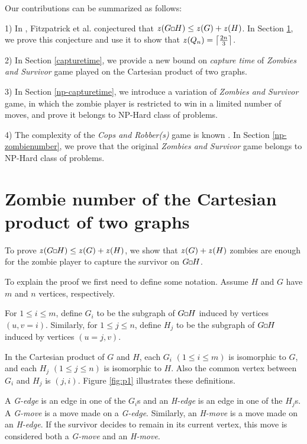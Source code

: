 \documentclass[1p]{elsarticle}
\DeclarePairedDelimiter\ceil{\lceil}{\rceil} \DeclarePairedDelimiter\floor{\lfloor}{\rfloor}
\newcommand{\zn}{\ooalign{$z$\cr\hfil\rule[.5ex]{.2em}{.08ex}\hfil\cr}}
\newcommand{\sq}[1][black]{%
\begin{tikzpicture}                                                           
  \draw[#1] (2pt,0pt) -- (6pt,0pt);   
  \draw[#1] (2pt,0pt) -- (2pt,4pt);    
  \draw[#1] (2pt,4pt) -- (6pt,4pt);   
  \draw[#1] (6pt,0pt) -- (6pt,4pt);
\end{tikzpicture}%
}
\begin{document}
Our contributions can be summarized as follows:

1) In \cite{Fitz16}, Fitzpatrick et al. conjectured that $\zn(G \sq H) \leq \zn(G) + \zn(H)$. In Section \ref{conj-proof}, we prove this conjecture and
use it to show that $\zn(Q_n) = \ceil*{\frac{2n}{3}}$. 

2) In Section \ref{capturetime}, we provide a new bound on {\it capture time} of {\it Zombies and Survivor} game played on the Cartesian
product of two graphs. 

3) In Section \ref{np-capturetime}, we introduce a variation of {\it Zombies and Survivor} game, in which the zombie
player is restricted to win in a limited number of moves, and prove it belongs to NP-Hard class of problems.

4) The complexity of the {\it Cops and Robber(s)} game is known \cite{Fomin10} \cite{Kinnersley15}. In Section
\ref{np-zombienumber}, we prove that the original {\it Zombies and Survivor} game belongs to NP-Hard class of problems.


\section{Zombie number of the Cartesian product of two graphs}\label{conj-proof}

To prove $\zn(G \sq H) \leq \zn(G) + \zn(H)$, we show that $\zn(G) + \zn(H)$ zombies are enough for the zombie player to
capture the survivor on $G \sq H$.

To explain the proof we first need to define some notation. Assume $H$ and $G$ have $m$ and $n$ vertices,
respectively. 

For $1 \leq i \leq m$, define $G_i$ to be the subgraph of $G \sq H$ induced by vertices $(u,v = i)$. Similarly, for $1 \leq j \leq
n$, define $H_{j}$ to be the subgraph of $G \sq H$ induced by vertices $(u = j,v)$.

In the Cartesian product of $G$ and $H$, each $G_{i}$ $(1 \leq i \leq m)$ is isomorphic to $G$, and each $H_{j}$ $(1
\leq j \leq n)$ is isomorphic to $H$. Also the common vertex between $G_{i}$ and $H_{j}$ is $(j,i)$. Figure \ref{fig:p1}
illustrates these definitions.

A {\it G-edge} is an edge in one of the $G_{i}$s and an {\it H-edge} is an edge in one of the $H_{j}$s. A {\it G-move}
is a move made on a {\it G-edge}. Similarly, an {\it H-move} is a move made on an {\it H-edge}. If the survivor decides
to remain in its current vertex, this move is considered both a {\it G-move} and an {\it H-move}. 
\end{document}

